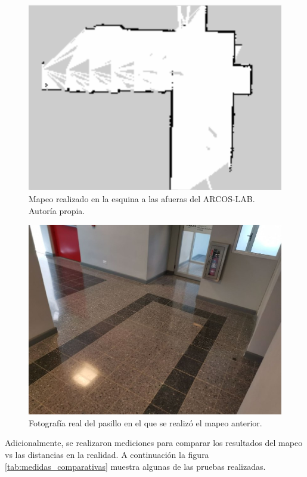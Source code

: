 \begin{figure}
\centering
\includegraphics[scale=0.5]{imagenes/mapeo_esquina.png}
\caption{Mapeo realizado en la esquina a las afueras del ARCOS-LAB. Autoría propia.}
\end{figure}

\begin{figure}
\centering
\includegraphics[scale=0.5]{imagenes/afueras_arcoslab.jpg}
\caption{Fotografía real del pasillo en el que se realizó el mapeo anterior.}
\end{figure}

Adicionalmente, se realizaron mediciones para comparar los resultados del mapeo vs las distancias en la realidad. A continuación la figura \ref{tab:medidas_comparativas} muestra algunas de las pruebas realizadas.

